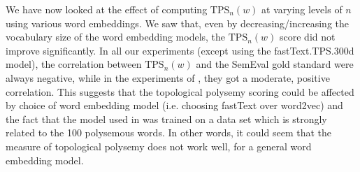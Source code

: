 We have now looked at the effect of computing $\text{TPS}_n(w)$ at varying levels of $n$ using various word embeddings. We saw that, even by decreasing/increasing the vocabulary size of the word embedding models, the $\text{TPS}_n(w)$ score did not improve significantly. In all our experiments (except using the fastText.TPS.300d model), the correlation between $\text{TPS}_n(w)$ and the SemEval gold standard were always negative, while in the experiments of \cite{jakubowski2020topology}, they got a moderate, positive correlation. This suggests that the topological polysemy scoring could be affected by choice of word embedding model (i.e. choosing fastText over word2vec) and the fact that the model used in \cite{jakubowski2020topology} was trained on a data set which is strongly related to the 100 polysemous words. In other words, it could seem that the measure of topological polysemy does not work well, for a general word embedding model.

